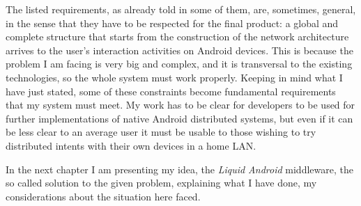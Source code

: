 The listed requirements, as already told in some of them, are, sometimes, general, in the sense that they have to be respected for the final product: a global and complete structure that starts from the construction of the network architecture arrives to the user's interaction activities on Android devices. This is because the problem I am facing is very big and complex, and it is transversal to the existing technologies, so the whole system must work properly. Keeping in mind what I have just stated, some of these constraints become fundamental requirements that my system must meet. My work has to be clear for developers to be used for further implementations of native Android distributed systems, but even if it can be less clear to an average user it must be usable to those wishing to try distributed intents with their own devices in a home LAN.

\bigskip
\bigskip
\bigskip
\bigskip
\par
In the next chapter I am presenting my idea, the \textit{Liquid Android} middleware, the so called solution to the given problem, explaining what I have done, my considerations about the situation here faced.

%
